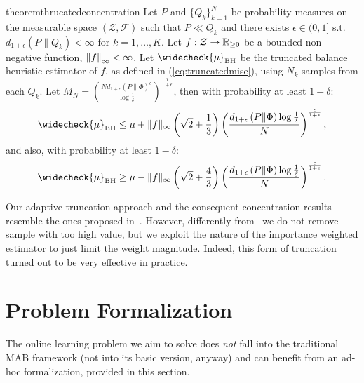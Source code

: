 \documentclass{article}
\begin{document}
\begin{restatable}{theorem}{thrucatedconcentration}\label{lem:thrucatedconcentration}
	Let $P$ and $\{ Q_k \}_{k=1}^N$ be probability measures on the measurable space $(\mathcal{Z},\mathcal{F})$ such that $P\ll Q_k$ and there exists $\epsilon \in (0,1]$ s.t. $d_{1+\epsilon}(P\|Q_k)<\infty$ for $k=1,\dots,K$. Let $f:\mathcal{Z}\to\Reals_{\ge 0}$ be a bounded non-negative function, \ie $\norm[\infty]{f}<\infty$. Let $\widecheck{\mu}_{\text{BH}}$ be the truncated balance heuristic estimator of $f$, as defined in (\ref{eq:truncatedmise}), using $N_k$ \iid samples from each $Q_k$. 
	Let $M_N = \left( \frac{N d_{1+\epsilon}\left( P \| \Phi  \right)^{\epsilon} }{\log \frac{1}{\delta}} \right) ^{\frac{1}{1+\epsilon}}$, then with probability at least $1-\delta$:
    \begin{equation}\label{eq:1.1}
        \widecheck{\mu}_{\text{BH}} \le \mu + \|f\|_{\infty} \left(\sqrt{2} + \frac{1}{3} \right)  \left(\frac{ d_{1+\epsilon}\left( P \| \Phi  \right) \log  \frac{1}{\delta}  }{N} \right)^{\frac{\epsilon}{1+\epsilon}},
    \end{equation}
    and also, with probability at least $1-\delta$:
    \begin{equation}\label{eq:1.2}
        \widecheck{\mu}_{\text{BH}} \ge \mu - \|f\|_{\infty} \left(\sqrt{2} + \frac{4}{3} \right) \left(\frac{ d_{1+\epsilon}\left( P \| \Phi  \right) \log  \frac{1}{\delta}  }{N} \right)^{\frac{\epsilon}{1+\epsilon}}.
    \end{equation}
\end{restatable}

Our adaptive truncation approach and the consequent concentration results resemble the ones proposed in~\cite{bubeck2013bandits}. However, differently from~\cite{bubeck2013bandits} we do not remove sample with too high value, but we exploit the nature of the importance weighted estimator to just limit the weight magnitude. Indeed, this form of truncation turned out to be very effective in practice.

\section{Problem Formalization}
The online learning problem we aim to solve does \textit{not} fall into the traditional MAB framework (not into its basic version, anyway) and can benefit from an ad-hoc formalization, provided in this section.
\end{document}
